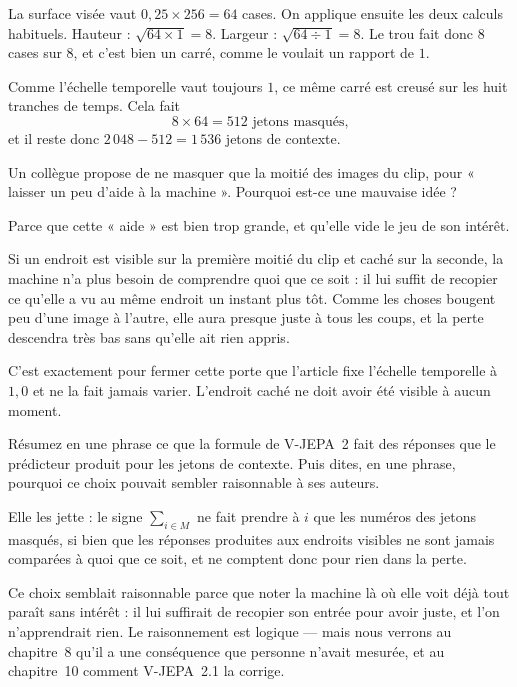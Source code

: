 \begin{solution}
La surface visée vaut $0{,}25 \times 256 = 64$ cases. On applique ensuite
les deux calculs habituels. Hauteur : $\sqrt{64 \times 1} = 8$. Largeur :
$\sqrt{64 \div 1} = 8$. Le trou fait donc $8$ cases sur $8$, et c'est bien
un carré, comme le voulait un rapport de $1$.

Comme l'échelle temporelle vaut toujours $1$, ce même carré est creusé sur
les huit tranches de temps. Cela fait
\[
  8 \times 64 = 512 \text{ jetons masqués,}
\]
et il reste donc $2\,048 - 512 = 1\,536$ jetons de contexte.
\end{solution}

\begin{exercice}
Un collègue propose de ne masquer que la moitié des images du clip, pour
« laisser un peu d'aide à la machine ». Pourquoi est-ce une mauvaise idée ?
\end{exercice}

\begin{solution}
Parce que cette « aide » est bien trop grande, et qu'elle vide le jeu de son
intérêt.

Si un endroit est visible sur la première moitié du clip et caché sur la
seconde, la machine n'a plus besoin de comprendre quoi que ce soit : il lui
suffit de recopier ce qu'elle a vu au même endroit un instant plus tôt.
Comme les choses bougent peu d'une image à l'autre, elle aura presque juste
à tous les coups, et la perte descendra très bas sans qu'elle ait rien
appris.

C'est exactement pour fermer cette porte que l'article fixe l'échelle
temporelle à $1{,}0$ et ne la fait jamais varier. L'endroit caché ne doit
avoir été visible à aucun moment.
\end{solution}

\begin{exercice}
Résumez en une phrase ce que la formule de V-JEPA~2 fait des réponses que le
prédicteur produit pour les jetons de contexte. Puis dites, en une phrase,
pourquoi ce choix pouvait sembler raisonnable à ses auteurs.
\end{exercice}

\begin{solution}
Elle les jette : le signe $\sum_{i \in M}$ ne fait prendre à $i$ que les
numéros des jetons masqués, si bien que les réponses produites aux endroits
visibles ne sont jamais comparées à quoi que ce soit, et ne comptent donc
pour rien dans la perte.

Ce choix semblait raisonnable parce que noter la machine là où elle voit
déjà tout paraît sans intérêt : il lui suffirait de recopier son entrée pour
avoir juste, et l'on n'apprendrait rien. Le raisonnement est logique — mais
nous verrons au chapitre~8 qu'il a une conséquence que personne n'avait
mesurée, et au chapitre~10 comment V-JEPA~2.1 la corrige.
\end{solution}

